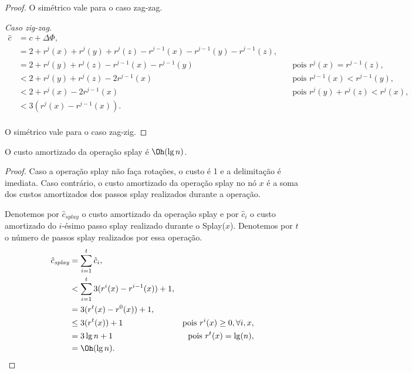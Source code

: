 \begin{proof}
    O simétrico vale para o caso zag-zag.

    \textit{Caso zig-zag}.   
    \begin{align*}
        \hat{c} &= c + \Delta \Phi,\\
        &= 2 + r^{j}(x) + r^{j}(y) + r^{j}(z) - r^{j-1}(x) - r^{j-1}(y) - r^{j-1}(z), \quad & \text{}\\
        &= 2 + r^{j}(y) + r^{j}(z) - r^{j-1}(x) - r^{j-1}(y) \quad & \text{pois $r^{j}(x) = r^{j-1}(z)$},\\
        &< 2 + r^{j}(y) + r^{j}(z) - 2r^{j-1}(x) \quad & \text{pois $r^{j-1}(x) < r^{j-1}(y)$},\\
        &< 2 + r^{j}(x) - 2r^{j-1}(x) \quad & \text{pois $r^{j}(y) + r^{j}(z) < r^{j}(x)$},\\
        &< 3(r^{j}(x) - r^{j-1}(x)). \\
    \end{align*}

    O simétrico vale para o caso zag-zig.
\end{proof}

\begin{theorem}
    O custo amortizado da operação splay é $\Oh(\lg n)$.
\end{theorem}

\begin{proof}
    Caso a operação splay não faça rotações, o custo é 1 e a delimitação é imediata. Caso contrário, o custo amortizado da operação splay no nó $x$ é a soma dos custos amortizados dos passos splay realizados durante a operação.

    Denotemos por $\hat{c}_{\textit{splay}}$ o custo amortizado da operação splay e por $\hat{c}_{i}$ o custo amortizado do $i$-ésimo passo splay realizado durante o Splay($x$). Denotemos por $t$ o número de passos splay realizados por essa operação.
    \begin{align*}
        \hat{c}_{\textit{splay}} &= \sum_{i = 1}^{t} \hat{c}_{i}, \\
        &< \sum_{i = 1}^{t} {3(r^{i}(x) - r^{i-1}(x)) + 1}, \\
        &= 3(r^{t}(x) - r^{0}(x)) + 1, \\ 
        &\leq 3(r^{t}(x)) + 1 \quad & \text{pois $r^{i}(x) \geq 0, \forall i,x$}, \\  
        &= 3\lg n + 1 \quad & \text{pois $r^{t}(x) = \lg(n)$}, \\ 
        &= \Oh(\lg n).
    \end{align*}
\end{proof}
\newpage

